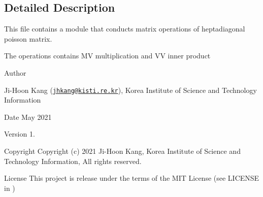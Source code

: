 \subsection{Detailed Description}
This file contains a module that conducts matrix operations of heptadiagonal poisson matrix. 

The operations contains MV multiplication and VV inner product \begin{DoxyAuthor}{Author}

\begin{DoxyItemize}
\item Ji-\/\+Hoon Kang (\href{mailto:jhkang@kisti.re.kr}{\tt jhkang@kisti.\+re.\+kr}), Korea Institute of Science and Technology Information
\end{DoxyItemize}
\end{DoxyAuthor}
\begin{DoxyDate}{Date}
May 2021 
\end{DoxyDate}
\begin{DoxyVersion}{Version}
1. 
\end{DoxyVersion}
\begin{DoxyParagraph}{Copyright}
Copyright (c) 2021 Ji-\/\+Hoon Kang, Korea Institute of Science and Technology Information, All rights reserved. 
\end{DoxyParagraph}
\begin{DoxyParagraph}{License }
This project is release under the terms of the M\+IT License (see L\+I\+C\+E\+N\+SE in ) 
\end{DoxyParagraph}
